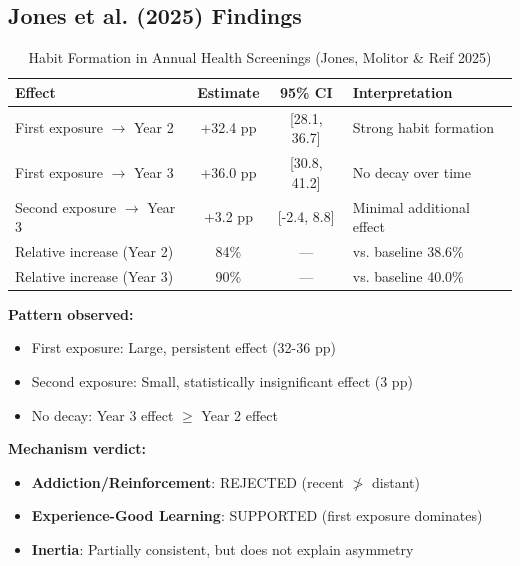 \subsection{Jones et al. (2025) Findings}

\begin{table}[htbp]
\centering
\caption{Habit Formation in Annual Health Screenings (Jones, Molitor \& Reif 2025)}
\label{tab:hf-jmr-results}
\renewcommand{\arraystretch}{1.4}
\begin{tabular}{@{}lccl@{}}
\toprule
\textbf{Effect} & \textbf{Estimate} & \textbf{95\% CI} & \textbf{Interpretation} \\
\midrule
First exposure $\rightarrow$ Year 2 & +32.4 pp & [28.1, 36.7] & Strong habit formation \\
First exposure $\rightarrow$ Year 3 & +36.0 pp & [30.8, 41.2] & No decay over time \\
Second exposure $\rightarrow$ Year 3 & +3.2 pp & [-2.4, 8.8] & Minimal additional effect \\
\midrule
Relative increase (Year 2) & 84\% & --- & vs. baseline 38.6\% \\
Relative increase (Year 3) & 90\% & --- & vs. baseline 40.0\% \\
\bottomrule
\end{tabular}
\end{table}

\begin{tcolorbox}[colback=green!5!white, colframe=green!75!black,
    title=Key Finding: Learning Mechanism Confirmed]

\textbf{Pattern observed:}
\begin{itemize}[nosep]
\item First exposure: Large, persistent effect (32-36 pp)
\item Second exposure: Small, statistically insignificant effect (3 pp)
\item No decay: Year 3 effect $\geq$ Year 2 effect
\end{itemize}

\textbf{Mechanism verdict:}
\begin{itemize}[nosep]
\item[$\times$] \textbf{Addiction/Reinforcement}: REJECTED (recent $\not>$ distant)
\item[$\checkmark$] \textbf{Experience-Good Learning}: SUPPORTED (first exposure dominates)
\item[?] \textbf{Inertia}: Partially consistent, but does not explain asymmetry
\end{itemize}

\end{tcolorbox}


